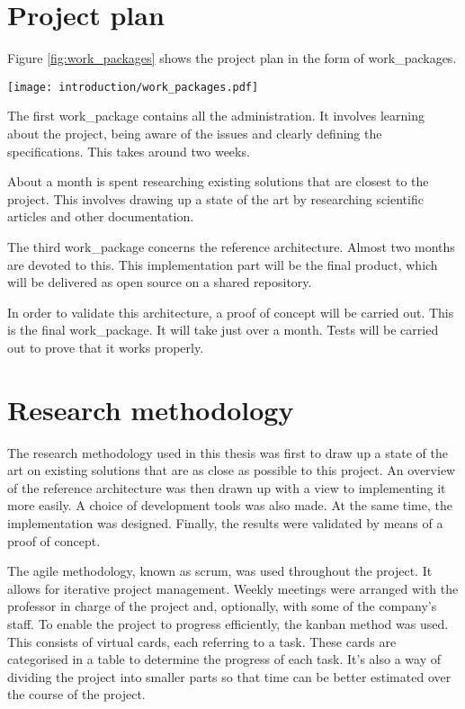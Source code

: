 \section{Project plan}

Figure \ref{fig:work_packages} shows the project plan in the form of \glspl{work_package}.
\begin{center}
    \begingroup
    \texttt{[image: introduction/work\_packages.pdf]}
    \label{fig:work_packages}
    \endgroup
\end{center}
The first \gls{work_package} contains all the administration. It involves learning about the project, being aware of the issues and clearly defining the specifications. This takes around two weeks.

About a month is spent researching existing solutions that are closest to the project. This involves drawing up a state of the art by researching scientific articles and other documentation.

The third \gls{work_package} concerns the reference architecture. Almost two months are devoted to this. This implementation part will be the final product, which will be delivered as open source on a shared repository.

In order to validate this architecture, a proof of concept will be carried out. This is the final \gls{work_package}. It will take just over a month. Tests will be carried out to prove that it works properly.

\section{Research methodology}

The research methodology used in this thesis was first to draw up a state of the art on existing solutions that are as close as possible to this project. An overview of the reference architecture was then drawn up with a view to implementing it more easily. A choice of development tools was also made. At the same time, the implementation was designed. Finally, the results were validated by means of a proof of concept.

The agile methodology, known as \gls{scrum}, was used throughout the project. It allows for iterative project management. Weekly meetings were arranged with the professor in charge of the project and, optionally, with some of the company's staff. To enable the project to progress efficiently, the \gls{kanban} method was used. This consists of virtual cards, each referring to a task. These cards are categorised in a table to determine the progress of each task. It's also a way of dividing the project into smaller parts so that time can be better estimated over the course of the project.


